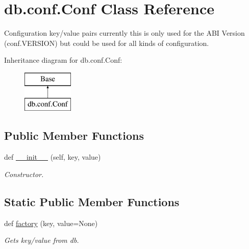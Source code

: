 \hypertarget{classdb_1_1conf_1_1_conf}{}\section{db.\+conf.\+Conf Class Reference}
\label{classdb_1_1conf_1_1_conf}


Configuration key/value pairs currently this is only used for the A\+BI Version (conf.\+V\+E\+R\+S\+I\+ON) but could be used for all kinds of configuration.  


Inheritance diagram for db.\+conf.\+Conf\+:\begin{figure}[H]
\begin{center}
\leavevmode
\includegraphics[height=2.000000cm]{d3/da3/classdb_1_1conf_1_1_conf}
\end{center}
\end{figure}
\subsection*{Public Member Functions}
\begin{DoxyCompactItemize}
\item 
def \mbox{\hyperlink{classdb_1_1conf_1_1_conf_a29c1f02ddcf9eb73316bdcde0c654a7d}{\+\_\+\+\_\+init\+\_\+\+\_\+}} (self, key, value)
\begin{DoxyCompactList}\small\item\em Constructor. \end{DoxyCompactList}\end{DoxyCompactItemize}
\subsection*{Static Public Member Functions}
\begin{DoxyCompactItemize}
\item 
def \mbox{\hyperlink{classdb_1_1conf_1_1_conf_a0e5941782c2bc7dea2350b235ba97597}{factory}} (key, value=None)
\begin{DoxyCompactList}\small\item\em Gets key/value from db. \end{DoxyCompactList}\end{DoxyCompactItemize}

